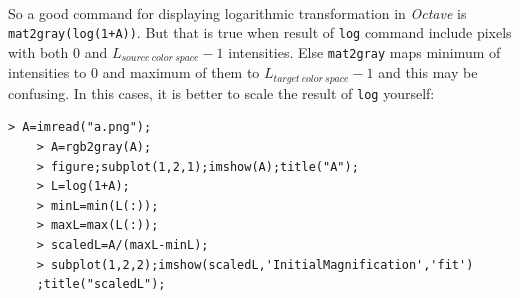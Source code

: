 \paragraph*{}So a good command for displaying logarithmic transformation in \emph{Octave} is
\texttt{mat2gray(log(1+A))}. But that is true when result of \texttt{log}
command include pixels with both $0$ and $L_{source\ color\ space}-1$ intensities. Else
\texttt{mat2gray} maps minimum of intensities to $0$ and maximum of them to
$L_{target\ color\ space}-1$ and this may be confusing. In this cases, it is
better to scale the result of \texttt{log} yourself:
\begin{Verbatim}[frame=single,label=Octave lab:\ Scale matrix yourself ]
    > A=imread("a.png");
    > A=rgb2gray(A);
    > figure;subplot(1,2,1);imshow(A);title("A");
    > L=log(1+A);
    > minL=min(L(:));
    > maxL=max(L(:));
    > scaledL=A/(maxL-minL);
    > subplot(1,2,2);imshow(scaledL,'InitialMagnification','fit')
    ;title("scaledL"); 
\end{Verbatim}

